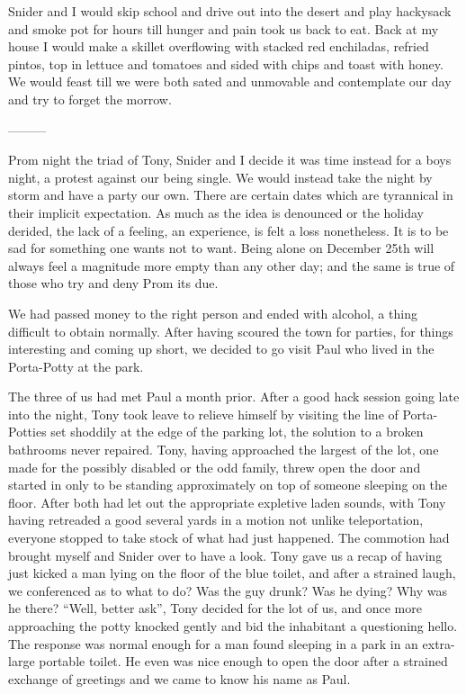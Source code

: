 \documentclass[ebook, 10pt, openright, onecolumn]{memoir}
\begin{document}

Snider and I would skip school and drive out into the desert and play
hackysack and smoke pot for hours till hunger and pain took us back to eat.
Back at my house I would make a skillet overflowing with stacked red enchiladas,
refried pintos, top in lettuce and tomatoes and sided with chips and toast with
honey.  We would feast till we were both sated and unmovable and contemplate our
day and try to forget the morrow.  

---------

Prom night the triad of Tony, Snider and I decide it was time instead for a boys
night, a protest against our being single.  We would instead take the night by
storm and have a party our own.  There are certain dates which are tyrannical in
their implicit expectation.  As much as the idea is denounced or the holiday
derided, the lack of a feeling, an experience, is felt a loss nonetheless.  It
is to be sad for something one wants not to want.  Being alone on December 25th
will always feel a magnitude more empty than any other day; and the same is true
of those who try and deny Prom its due.

We had passed money to the right person and ended with alcohol, a thing
difficult to obtain normally.  After having scoured the town for parties, for
things interesting and coming up short, we decided to go visit Paul who lived in
the Porta-Potty at the park.

The three of us had met Paul a month prior.  After a good hack session going
late into the night, Tony took leave to relieve himself by visiting the line of
Porta-Potties set shoddily at the edge of the parking lot, the solution to a
broken bathrooms never repaired.  Tony, having approached the largest of the
lot, one made for the possibly disabled or the odd family, threw open the door
and started in only to be standing approximately on top of someone sleeping on
the floor.  After both had let out the appropriate expletive laden sounds, with
Tony having retreaded a good several yards in a motion not unlike teleportation,
everyone stopped to take stock of what had just happened.  The commotion had
brought myself and Snider over to have a look.  Tony gave us a recap of having
just kicked a man lying on the floor of the blue toilet, and after a strained
laugh, we conferenced as to what to do?  Was the guy drunk?  Was he dying?  Why
was he there?  ``Well, better ask'', Tony decided for the lot of us, and once
more approaching the potty knocked gently and bid the inhabitant a questioning
hello.  The response was normal enough for a man found sleeping in a park in an
extra-large portable toilet.  He even was nice enough to open the door after a
strained exchange of greetings and we came to know his name as Paul.
\end{document}
